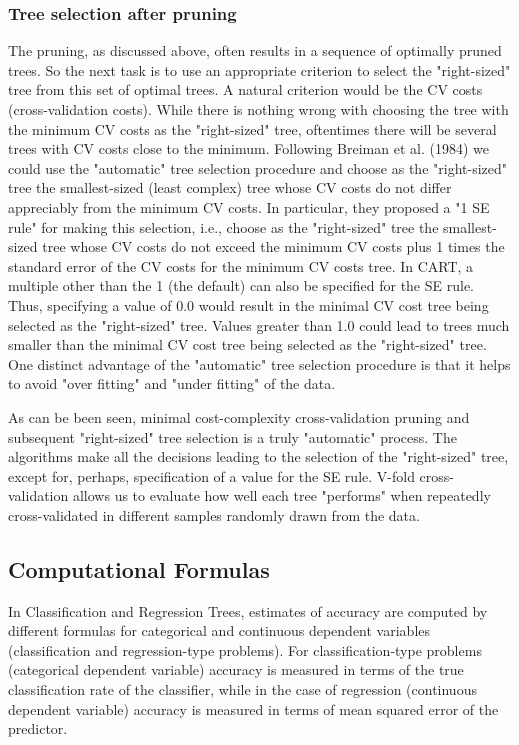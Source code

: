 \subsubsection{Tree selection after pruning}
The pruning, as discussed above, often results in a sequence of optimally pruned trees. So the next task is to use an appropriate criterion to select the "right-sized" tree from this set of optimal trees. A natural criterion would be the CV costs (cross-validation costs). While there is nothing wrong with choosing the tree with the minimum CV costs as the "right-sized" tree, oftentimes there will be several trees with CV costs close to the minimum. Following Breiman et al. (1984) we could use the "automatic" tree selection procedure and choose as the "right-sized" tree the smallest-sized (least complex) tree whose CV costs do not differ appreciably from the minimum CV costs. In particular, they proposed a "1 SE rule" for making this selection, i.e., choose as the "right-sized" tree the smallest-sized tree whose CV costs do not exceed the minimum CV costs plus 1 times the standard error of the CV costs for the minimum CV costs tree. In CART, a multiple other than the 1 (the default) can also be specified for the SE rule. Thus, specifying a value of 0.0 would result in the minimal CV cost tree being selected as the "right-sized" tree. Values greater than 1.0 could lead to trees much smaller than the minimal CV cost tree being selected as the "right-sized" tree. One distinct advantage of the "automatic" tree selection procedure is that it helps to avoid "over fitting" and "under fitting" of the data.

As can be been seen, minimal cost-complexity cross-validation pruning and subsequent "right-sized" tree selection is a truly "automatic" process. The algorithms make all the decisions leading to the selection of the "right-sized" tree, except for, perhaps, specification of a value for the SE rule. V-fold cross-validation allows us to evaluate how well each tree "performs" when repeatedly cross-validated in different samples randomly drawn from the data.


\subsection{Computational Formulas}

In Classification and Regression Trees, estimates of accuracy are computed by different formulas for categorical and continuous dependent variables (classification and regression-type problems). For classification-type problems (categorical dependent variable) accuracy is measured in terms of the true classification rate of the classifier, while in the case of regression (continuous dependent variable) accuracy is measured in terms of mean squared error of the predictor.

